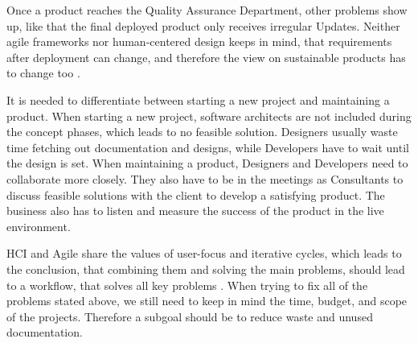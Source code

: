 Once a product reaches the Quality Assurance Department, other problems show up, like that the final deployed product only receives irregular Updates. Neither agile frameworks nor human-centered design keeps in mind, that requirements after deployment can change, and therefore the view on sustainable products has to change too \cite[p. 18, pp. 30-31]{ratcliffe2011agile}.

It is needed to differentiate between starting a new project and maintaining a product. When starting a new project, software architects are not included during the concept phases, which leads to no feasible solution. Designers usually waste time fetching out documentation and designs, while Developers have to wait until the design is set. When maintaining a product, Designers and Developers need to collaborate more closely. They also have to be in the meetings as Consultants to discuss feasible solutions with the client to develop a satisfying product. The business also has to listen and measure the success of the product in the live environment.

HCI and Agile share the values of user-focus and iterative cycles, which leads to the conclusion, that combining them and solving the main problems, should lead to a workflow, that solves all key problems \citep{HumanCom2:online}. When trying to fix all of the problems stated above, we still need to keep in mind the time, budget, and scope of the projects. Therefore a subgoal should be to reduce waste and unused documentation.
